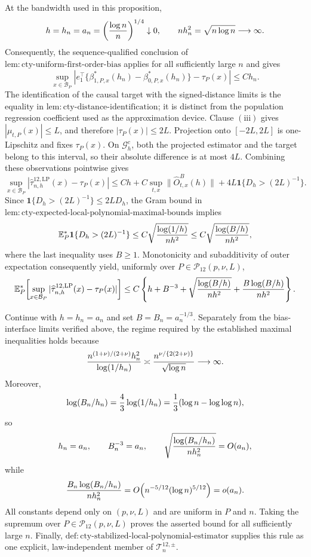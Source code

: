 At the bandwidth used in this proposition,
\[
 h=h_n=a_n=\left({\log n\over n}\right)^{1/4}\downarrow0,
 \qquad
 nh_n^2=\sqrt{n\log n}\longrightarrow\infty.
\]
Consequently, the sequence-qualified conclusion of \(\mathrm{lem:cty\text{-}uniform\text{-}first\text{-}order\text{-}bias}\) applies for all sufficiently large \(n\) and gives
\[
 \sup_{x\in\mathcal B_P}\left|
 e_1^\top\{\beta^*_{1,P,x}(h_n)-\beta^*_{0,P,x}(h_n)\}-\tau_P(x)
 \right|\leq Ch_n.
\]
The identification of the causal target with the signed-distance limits is the equality in \(\mathrm{lem:cty\text{-}distance\text{-}identification}\); it is distinct from the population regression coefficient used as the approximation device.  Clause \(\mathrm{(iii)}\) gives \(|\mu_{t,P}(x)|\leq L\), and therefore \(|\tau_P(x)|\leq2L\).  Projection onto \([-2L,2L]\) is one-Lipschitz and fixes \(\tau_P(x)\).  On \(\mathcal G_h^c\), both the projected estimator and the target belong to this interval, so their absolute difference is at most \(4L\).  Combining these observations pointwise gives
\[
 \sup_{x\in\mathcal B_P}
 |\widehat\tau^{12,\mathrm{LP}}_{n,h}(x)-\tau_P(x)|
 \leq Ch+C\sup_{t,x}\lVert\widehat O^B_{t,x}(h)\rVert
 +4L\mathbf1\{D_h>(2L)^{-1}\}.
\]
Since \(\mathbf1\{D_h>(2L)^{-1}\}\leq2LD_h\), the Gram bound in \(\mathrm{lem:cty\text{-}expected\text{-}local\text{-}polynomial\text{-}maximal\text{-}bounds}\) implies
\[
 \mathbb E_P^*\mathbf1\{D_h>(2L)^{-1}\}
 \leq C\sqrt{{\log(1/h)\over nh^2}}
 \leq C\sqrt{{\log(B/h)\over nh^2}},
\]
where the last inequality uses \(B\geq1\).  Monotonicity and subadditivity of outer expectation consequently yield, uniformly over \(P\in\mathcal P_{12}(p,\nu,L)\),
\[
 \mathbb E_P^*\!\left[
 \sup_{x\in\mathcal B_P}
 |\widehat\tau^{12,\mathrm{LP}}_{n,h}(x)-\tau_P(x)|
 \right]
 \leq C\left\{h+B^{-3}+\sqrt{{\log(B/h)\over nh^2}}
 +{B\log(B/h)\over nh^2}\right\}.
\]

Continue with \(h=h_n=a_n\) and set \(B=B_n=a_n^{-1/3}\).  Separately from the bias-interface limits verified above, the regime required by the established maximal inequalities holds because
\[
 {n^{(1+\nu)/(2+\nu)}h_n^2\over\log(1/h_n)}
 \asymp {n^{\nu/\{2(2+\nu)\}}\over\sqrt{\log n}}
 \longrightarrow\infty.
\]
Moreover,
\[
 \log(B_n/h_n)={4\over3}\log(1/h_n)
 ={1\over3}(\log n-\log\log n),
\]
so
\[
 h_n=a_n,\qquad B_n^{-3}=a_n,
 \qquad \sqrt{{\log(B_n/h_n)\over nh_n^2}}=O(a_n),
\]
while
\[
 {B_n\log(B_n/h_n)\over nh_n^2}
 =O\!\left(n^{-5/12}(\log n)^{5/12}\right)=o(a_n).
\]
All constants depend only on \((p,\nu,L)\) and are uniform in \(P\) and \(n\).  Taking the supremum over \(P\in\mathcal P_{12}(p,\nu,L)\) proves the asserted bound for all sufficiently large \(n\).  Finally, \(\mathrm{def:cty\text{-}stabilized\text{-}local\text{-}polynomial\text{-}estimator}\) supplies this rule as one explicit, law-independent member of \(\mathcal T_n^{12,\pm}\).